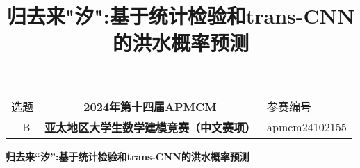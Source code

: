 \documentclass[withoutpreface,bwprint]{cumcmthesis} %
\title{\textbf{归去来"汐":基于统计检验和trans-CNN的洪水概率预测} }
\begin{document}
\begin{table}
	\centering
	\begin{tabular}{|l|c|l|} 
		\toprule
		\qquad \quad 选题 & \textbf{2024年第十四届APMCM}      & 参赛编号           \\ 
		\cline{1-1}\cline{3-3}
		\qquad \quad ~~B  & \textbf{亚太地区大学生数学建模竞赛（中文赛项）} & apmcm24102155  \\
		\bottomrule
	\end{tabular}
\end{table}



\textbf{归去来“汐”:基于统计检验和trans-CNN的洪水概率预测}
\endgraf 
\nopagebreak
\end{document}
